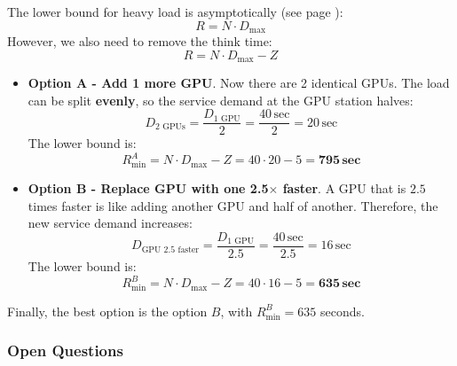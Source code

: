 \begin{enumerate}
    \highspace
    The lower bound for heavy load is asymptotically (see page \pageref{eq: lower bound for heavy load}):
    \begin{equation*}
        R = N \cdot D_{\max}
    \end{equation*}
    However, we also need to remove the think time:
    \begin{equation*}
        R = N \cdot D_{\max} - Z
    \end{equation*}
    \begin{itemize}
        \item \textbf{Option A - Add 1 more GPU}. Now there are 2 identical GPUs. The load can be split \textbf{evenly}, so the service demand at the GPU station halves:
        \begin{equation*}
            D_{\text{2 GPUs}} = \dfrac{D_{\text{1 GPU}}}{2} = \dfrac{40 \, \text{sec}}{2} = 20 \, \text{sec}
        \end{equation*}
        The lower bound is:
        \begin{equation*}
            R_{\min}^{A} = N \cdot D_{\max} - Z = 40 \cdot 20 - 5 = \mathbf{795} \, \textbf{sec}
        \end{equation*}
        \item \textbf{Option B - Replace GPU with one 2.5$\times$ faster}. A GPU that is $2.5$ times faster is like adding another GPU and half of another. Therefore, the new service demand increases:
        \begin{equation*}
            D_{\text{GPU 2.5 faster}} = \dfrac{D_{\text{1 GPU}}}{2.5} = \dfrac{40 \, \text{sec}}{2.5} = 16 \, \text{sec}
        \end{equation*}
        The lower bound is:
        \begin{equation*}
            R_{\min}^{B} = N \cdot D_{\max} - Z = 40 \cdot 16 - 5 = \mathbf{635} \, \textbf{sec}
        \end{equation*}
    \end{itemize}
    Finally, the best option is the option $B$, with $R_{\min}^{B} = 635$ seconds.

    \newpage
\end{enumerate}

\subsubsection*{Open Questions}

